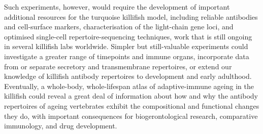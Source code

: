 Such experiments, however, would require the development of important additional resources for the turquoise killifish model, including reliable antibodies and cell-surface markers, characterisation of the light-chain gene loci, and optimised single-cell repertoire-sequencing techniques, work that is still ongoing in several killifish labs worldwide. Simpler but still-valuable experiments could investigate a greater range of timepoints and immune organs, incorporate data from  or separate secretory and transmembrane  repertoires, or extend our knowledge of killifish antibody repertoires to development and early adulthood. Eventually, a whole-body, whole-lifespan atlas of adaptive-immune ageing in the killifish could reveal a great deal of information about how and why the antibody repertoires of ageing vertebrates exhibit the compositional and functional changes they do, with important consequences for biogerontological research, comparative immunology, and drug development.